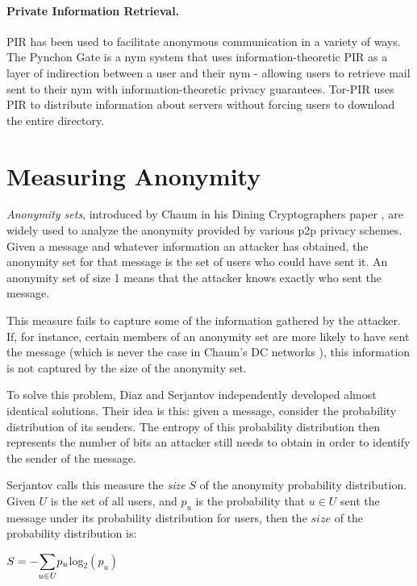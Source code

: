 \documentclass{paper}
\begin{document}
\paragraph{Private Information Retrieval.} PIR has been used to facilitate anonymous communication in a variety of ways. The Pynchon Gate \cite{wpes2005} is a nym system that uses information-theoretic PIR as a layer of indirection between a user and their nym - allowing users to retrieve mail sent to their nym with information-theoretic privacy guarantees. Tor-PIR \cite{TODO} uses PIR to distribute information about servers without forcing users to download the entire directory. 

\section{Measuring Anonymity}
  \textit{Anonymity sets}, introduced by Chaum in his Dining Cryptographers paper \cite{chaum-dc}, are widely used to analyze the anonymity provided by various p2p privacy schemes. Given a message and whatever information an attacker has obtained, the anonymity set for that message is the set of users who could have sent it. An anonymity set of size 1 means that the attacker knows exactly who sent the message.

This measure fails to capture some of the information gathered by the attacker. If, for instance, certain members of an anonymity set are more likely to have sent the message (which is never the case in Chaum's DC networks \cite{chaum-dc}), this information is not captured by the size of the anonymity set. 

To solve this problem, Diaz \cite{Diaz02} and Serjantov \cite{Serj02} independently developed almost identical solutions. Their idea is this: given a message, consider the probability distribution of its senders. The entropy of this probability distribution then represents the number of bits an attacker still needs to obtain in order to identify the sender of the message. 

Serjantov \cite{Serj02} calls this measure the \textit{size} $S$ of the anonymity probability distribution. Given $U$ is the set of all users, and $p_u$ is the probability that $u \in U$ sent the message under its probability distribution for users, then the $size$ of the probability distribution is:

\begin{center}
$ S = - \mathlarger{\sum}\limits_{u \in U} p_u $log$_2(p_u)$
\end{center}
\end{document}
